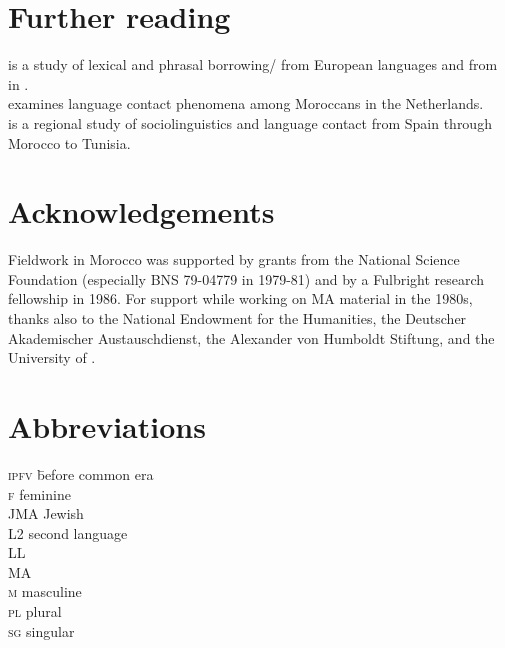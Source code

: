 \documentclass[output=paper]{langsci/langscibook}
\begin{document}
\section*{Further reading}

\citet{Heath1989} is a study of lexical and phrasal borrowing/ from European languages and from   in  .\\
\citet{Nortier1990} examines language contact phenomena among Moroccans in the Netherlands.\\
\citet{Sayahi2014} is a regional study of  sociolinguistics and language contact from Spain through Morocco to Tunisia.

\section*{Acknowledgements}

Fieldwork in Morocco was supported by grants from the National Science Foundation (especially BNS 79-04779 in 1979-81) and by a Fulbright research fellowship in 1986. For support while working on MA material in the 1980s, thanks also to the National Endowment for the Humanities, the Deutscher Akademischer Austauschdienst, the Alexander von Humboldt Stiftung, and the  University of .

\newpage

\section*{Abbreviations}
\begin{multicols}{2}
\begin{tabbing}
\textsc{ipfv} \hspace{1em} \= before common era\kill
{}          \>  \\
\textsc{f}  \> feminine\\
JMA         \> Jewish  \\
L2          \> second language \\
LL          \>  \\
MA          \>  \\
\textsc{m}  \> masculine\\
\textsc{pl} \> plural\\
\textsc{sg} \> singular
\end{tabbing}
\end{multicols}


{\sloppy\printbibliography[heading=subbibliography,notkeyword=this]}
\end{document}
